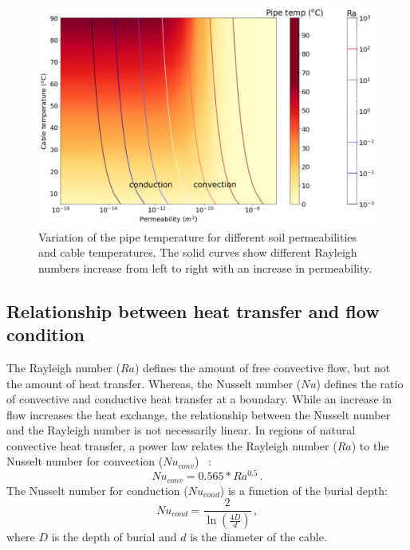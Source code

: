\documentclass[Journal,letterpaper,InsideFigs]{ascelike-new}
\begin{document}
\begin{figure}
    \centering
    \includegraphics[width=\textwidth]{figs/conduction-convection.png}
    \caption{Variation of the pipe temperature for different soil permeabilities and cable temperatures. The solid curves show different Rayleigh numbers increase from left to right with an increase in permeability.}
    \label{fig:ra-temp-contour}
\end{figure}

\subsection*{Relationship between heat transfer and flow condition}
The Rayleigh number ($Ra$) defines the amount of free convective flow, but not the amount of heat transfer. Whereas, the Nusselt number ($Nu$) defines the ratio of convective and conductive heat transfer at a boundary. While an increase in flow increases the heat exchange, the relationship between the Nusselt number and the Rayleigh number is not necessarily linear. In regions of natural convective heat transfer, a power law relates the Rayleigh number ($Ra$) to the Nusselt number for convection ($Nu_{conv}$) ~\cite{hardee1976boundary,merkin1979free}:
\begin{equation}
Nu_{conv} = 0.565 * Ra^{0.5}\,.
\label{eq:nu-conv}
\end{equation}
The Nusselt number for conduction ($Nu_{cond}$) is a function of the burial depth:
\begin{equation}
    Nu_{cond} = \frac{2}{\ln \left(\frac{4 D}{d}\right)}\,,
    \label{eq:nu-cond}
\end{equation}
where $D$ is the depth of burial and $d$ is the diameter of the cable. 
\end{document}
